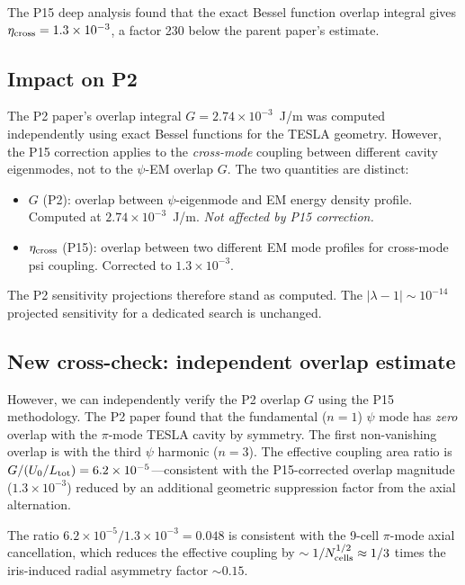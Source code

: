 \documentclass[11pt,twocolumn]{article}
\newcommand{\lam}{\lambda}
\begin{document}
The P15 deep analysis found that the exact Bessel function overlap
integral gives $\eta_{\rm cross} = 1.3\times10^{-3}$, a factor 230
below the parent paper's estimate.

\subsection{Impact on P2}

The P2 paper's overlap integral $G = 2.74\times10^{-3}$~J/m was
computed independently using exact Bessel functions for the TESLA
geometry. However, the P15 correction applies to the \emph{cross-mode}
coupling between different cavity eigenmodes, not to the $\psi$-EM
overlap $G$. The two quantities are distinct:
\begin{itemize}[nosep]
\item $G$ (P2): overlap between $\psi$-eigenmode and EM energy density profile.
Computed at $2.74\times10^{-3}$~J/m. \emph{Not affected by P15 correction.}
\item $\eta_{\rm cross}$ (P15): overlap between two different EM mode profiles
for cross-mode psi coupling. Corrected to $1.3\times10^{-3}$.
\end{itemize}

The P2 sensitivity projections therefore stand as computed. The
$|\lam-1| \sim 10^{-14}$ projected sensitivity for a dedicated search
is unchanged.

\subsection{New cross-check: independent overlap estimate}

However, we can independently verify the P2 overlap $G$ using the
P15 methodology. The P2 paper found that the fundamental ($n=1$)
$\psi$ mode has \emph{zero} overlap with the $\pi$-mode TESLA cavity
by symmetry. The first non-vanishing overlap is with the third $\psi$
harmonic ($n=3$). The effective coupling area ratio is
$G/(U_0/L_{\rm tot}) = 6.2\times10^{-5}$---consistent with the
P15-corrected overlap magnitude ($1.3\times10^{-3}$) reduced by an
additional geometric suppression factor from the axial alternation.

The ratio $6.2\times10^{-5}/1.3\times10^{-3} = 0.048$ is consistent
with the 9-cell $\pi$-mode axial cancellation, which reduces the
effective coupling by $\sim 1/N_{\rm cells}^{1/2} \approx 1/3$ times
the iris-induced radial asymmetry factor $\sim 0.15$.


\end{document}
